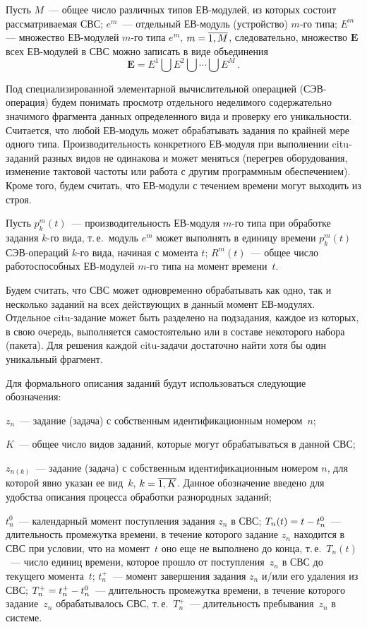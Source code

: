 \begin{multicols}{2}
Пусть
$M$~--- общее число различных типов ЕВ-мо\-ду\-лей, из которых состоит рассматриваемая СВС;
$e^m$~--- отдельный ЕВ-мо\-дуль (устройство) \mbox{$m$-го} типа;
$E^m$~ --- множество  ЕВ-мо\-ду\-лей $m$-го типа $e^m$, $m \hm= \overline{1, M}$,
следовательно,  множество $\textbf{E}$ всех ЕВ-мо\-ду\-лей в СВС можно
записать в виде объединения
$$
\textbf{E} = E^1 \bigcup E^2 \bigcup \cdots \bigcup E^M\,. 
$$

Под специализированной элементарной вы\-чис\-ли\-тельной операцией
(СЭВ-опе\-ра\-ция) будем \mbox{понимать} просмотр отдельного
неделимого содержательно значимого фрагмента данных определенного
вида  и проверку  его  уникальности. Считается, что любой ЕВ-модуль
может обрабатывать задания по крайней мере одного типа.
Производительность конкретного ЕВ-мо\-ду\-ля при выполнении citu-за\-да\-ний
разных видов  не одинакова и может меняться (перегрев оборудования,
изменение тактовой час\-то\-ты или работа с другим программным
обеспечением). Кроме того, будем считать, что ЕВ-мо\-ду\-ли с течением
времени  могут выходить из строя.

Пусть $p_k^m(t)$~--- производительность  ЕВ-мо\-ду\-ля $m$-го типа при
обработке задания $k$-го вида, т.\,е.\ модуль $e^m$ может выполнять в
единицу времени   $p_k^m(t)$  СЭВ-опе\-ра\-ций $k$-го вида, начиная с
момента $t$; $R^m(t)$~---  общее число работоспособных ЕВ-мо\-ду\-лей
$m$-го типа на момент времени~$t$.


Будем считать, что СВС может одновременно обрабатывать как одно, так
и несколько заданий на всех действующих в данный момент 
ЕВ-мо\-ду\-лях. Отдельное citu-за\-да\-ние может быть разделено на
подзадания, каж\-дое из которых, в свою очередь, выполняется
самостоятельно или в составе некоторого набора (пакета). Для решения
каж\-дой citu-за\-да\-чи достаточно найти хотя бы один уникальный
фрагмент.

Для формального описания  заданий будут использоваться следующие обозначения:

$z_{n}$~--- задание (задача) с собственным идентификационным номером~$n$;

$K$~--- общее число видов заданий, которые могут обрабатываться в
данной СВС;

$z_{n{(k)}}$~--- задание (задача) с собственным идентификационным
номером $n$, для которой явно указан ее вид~$k$, $k\hm=\overline {1,K}$.
Данное обозначение введено для удобства описания  процесса обработки
разнородных заданий;

$t_n^0$~--- календарный момент поступления задания $z_n$ в СВС;
$T_n(t)\hm=t \hm- t_n^0$~--- длительность  промежутка
времени,  в течение которого задание $z_n$ находится в СВС при
условии, что на момент~$t$ оно еще не выполнено до конца, т.\,е.\
$T_n(t)$~---  число единиц времени, которое прошло от поступления~$z_n$ 
в СВС  до текущего момента~$t$; $t_n^+$~--- момент завершения
задания $z_n$ и/или  его удаления из СВС; $T_n^+ \hm= t_n^+ \hm- t_n^0$~--- 
длительность  промежутка времени, в течение которого задание~$z_n$  обрабатывалось  СВС,\linebreak 
т.\,е.\ $T_n^+$~---  длительность пребывания~$z_n$ в сис\-теме.



\end{multicols}
